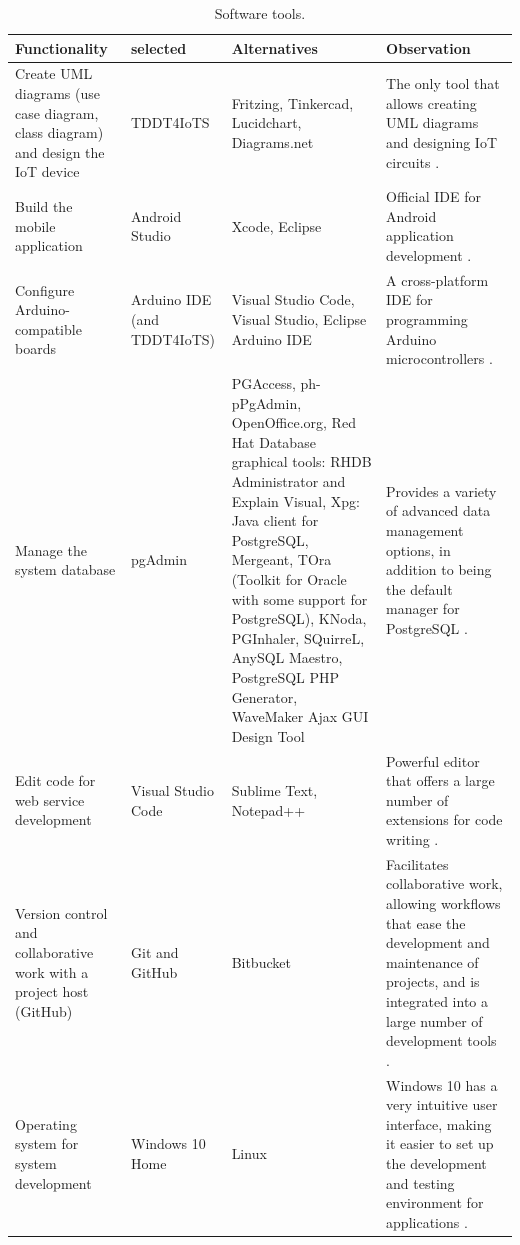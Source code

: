 \documentclass[a4paper,fleqn]{cas-sc}
\begin{document}
					\begin{table}[ht!]
						\caption{Software tools.}
						\label{table:software-selection}
						\centering
						\begin{tabular}{p{0.23\textwidth}p{}p{}p{}}
							\hline
							\multicolumn{1}{l}{\textbf{Functionality}} & \multicolumn{1}{l}{\textbf{selected}} & \multicolumn{1}{l}{\textbf{Alternatives}} & \multicolumn{1}{l}{\textbf{Observation}} \\ \hline
							\rule{0pt}{12pt}Create UML diagrams (use case diagram, class diagram) and design the IoT device & TDDT4IoTS & Fritzing, Tinkercad, Lucidchart, Diagrams.net & The only tool that allows creating UML diagrams and designing IoT circuits \citep{Guerrero-Ulloa2023Nawi}. \\
							\rule{0pt}{12pt}Build the mobile application & Android Studio & Xcode, Eclipse & Official IDE for Android application development \citep{Sharma2021Real-Time}. \\
							\rule{0pt}{12pt}Configure Arduino-compatible boards & Arduino IDE (and TDDT4IoTS) & Visual Studio Code, Visual Studio, Eclipse Arduino IDE & A cross-platform IDE for programming Arduino microcontrollers \citep{Perumal2021Detection}. \\
							\rule{0pt}{12pt}Manage the system database & pgAdmin & PGAccess, ph- pPgAdmin, OpenOffice.org, Red Hat Database graphical tools: RHDB Administrator and Explain Visual, Xpg: Java client for PostgreSQL, Mergeant, TOra (Toolkit for Oracle with some support for PostgreSQL), KNoda, PGInhaler, SQuirreL, AnySQL Maestro, PostgreSQL PHP Generator, WaveMaker Ajax GUI Design Tool & Provides a variety of advanced data management options, in addition to being the default manager for PostgreSQL \citep{Jung2015AStudy}. \\
							\rule{0pt}{12pt}Edit code for web service development & Visual Studio Code & Sublime Text, Notepad++ & Powerful editor that offers a large number of extensions for code writing \citep{Vahlbrock2022VSCode}. \\
							\rule{0pt}{12pt}Version control and collaborative work with a project host (GitHub) & Git and GitHub & Bitbucket & Facilitates collaborative work, allowing workflows that ease the development and maintenance of projects, and is integrated into a large number of development tools \citep{Popescu2015South}. \\
							\rule{0pt}{12pt}Operating system for system development & Windows 10 Home & Linux & Windows 10 has a very intuitive user interface, making it easier to set up the development and testing environment for applications \citep{Softic2022Windows}. \\ \hline
						\end{tabular}
					\end{table}
\end{document}
